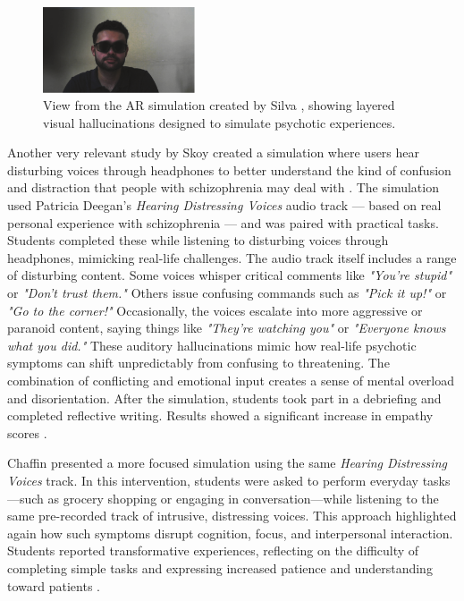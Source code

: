 \begin{figure}[H]
  \centering
  \includegraphics[width=0.4\textwidth]{../../Figures/silva_ar_scene.png}
  \caption{View from the AR simulation created by Silva \cite{Silva2017}, showing layered visual hallucinations designed to simulate psychotic experiences.}
  \label{fig:silva_ar_scene}
\end{figure}


\vspace{1em}

Another very relevant study by Skoy \cite{Skoy2016} created a simulation where users hear disturbing voices through headphones to better understand the kind of confusion and distraction that people with schizophrenia may deal with \cite{Skoy2016}. The simulation used Patricia Deegan's \emph{Hearing Distressing Voices} audio track — based on real personal experience with schizophrenia — and was paired with practical tasks. Students completed these while listening to disturbing voices through headphones, mimicking real-life challenges. The audio track itself includes a range of disturbing content. Some voices whisper critical comments like \emph{"You're stupid"} or \emph{"Don't trust them."} Others issue confusing commands such as \emph{"Pick it up!"} or \emph{"Go to the corner!"} Occasionally, the voices escalate into more aggressive or paranoid content, saying things like \emph{"They’re watching you"} or \emph{"Everyone knows what you did."} These auditory hallucinations mimic how real-life psychotic symptoms can shift unpredictably from confusing to threatening. The combination of conflicting and emotional input creates a sense of mental overload and disorientation. After the simulation, students took part in a debriefing and completed reflective writing. Results showed a significant increase in empathy scores \cite{Skoy2016}.

\vspace{1em}

Chaffin \cite{Chaffin2013} presented a more focused simulation using the same \emph{Hearing Distressing Voices} track. In this intervention, students were asked to perform everyday tasks—such as grocery shopping or engaging in conversation—while listening to the same pre-recorded track of intrusive, distressing voices. This approach highlighted again how such symptoms disrupt cognition, focus, and interpersonal interaction. Students reported transformative experiences, reflecting on the difficulty of completing simple tasks and expressing increased patience and understanding toward patients \cite{Chaffin2013}.


